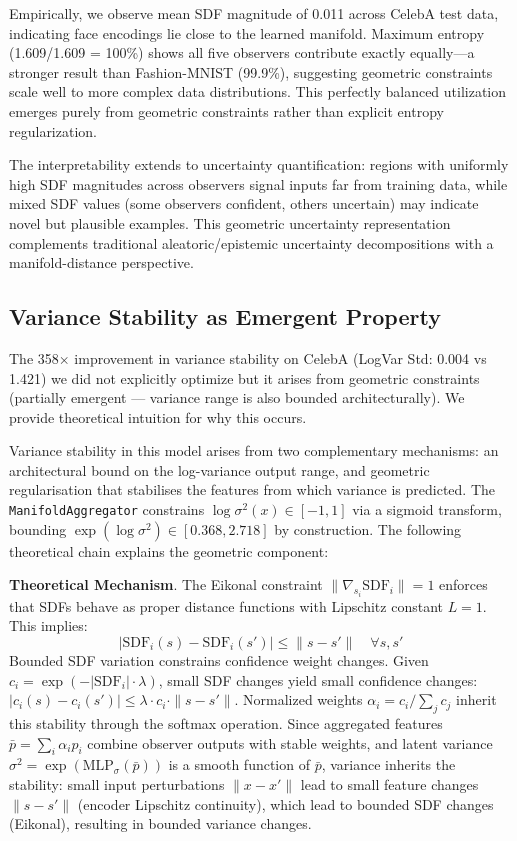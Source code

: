 \documentclass[10pt,twocolumn,letterpaper]{article}
\begin{document}
Empirically, we observe mean SDF magnitude of 0.011 across CelebA test data, indicating face encodings lie close to the learned manifold. Maximum entropy (1.609/1.609 = 100\%) shows all five observers contribute exactly equally---a stronger result than Fashion-MNIST (99.9\%), suggesting geometric constraints scale well to more complex data distributions. This perfectly balanced utilization emerges purely from geometric constraints rather than explicit entropy regularization.

The interpretability extends to uncertainty quantification: regions with uniformly high SDF magnitudes across observers signal inputs far from training data, while mixed SDF values (some observers confident, others uncertain) may indicate novel but plausible examples. This geometric uncertainty representation complements traditional aleatoric/epistemic uncertainty decompositions with a manifold-distance perspective.

\subsection{Variance Stability as Emergent Property}

The 358$\times$ improvement in variance stability on CelebA (LogVar Std: 0.004 vs 1.421) we did not explicitly optimize but it arises from geometric constraints (partially emergent --- variance range is also bounded architecturally). We provide theoretical intuition for why this occurs.

Variance stability in this model arises from two complementary mechanisms: an architectural bound on the log-variance output range, and geometric regularisation that stabilises the features from which variance is predicted. The \texttt{ManifoldAggregator} constrains $\log\sigma^2(x) \in [-1, 1]$ via a sigmoid transform, bounding $\exp(\log\sigma^2) \in [0.368, 2.718]$ by construction. The following theoretical chain explains the geometric component:

\textbf{Theoretical Mechanism}. The Eikonal constraint $\|\nabla_{s_i} \text{SDF}_i\| = 1$ enforces that SDFs behave as proper distance functions with Lipschitz constant $L=1$. This implies:
\begin{equation}
|\text{SDF}_i(s) - \text{SDF}_i(s')| \leq \|s - s'\| \quad \forall s, s'
\end{equation}
Bounded SDF variation constrains confidence weight changes. Given $c_i = \exp(-|\text{SDF}_i| \cdot \lambda)$, small SDF changes yield small confidence changes: $|c_i(s) - c_i(s')| \leq \lambda \cdot c_i \cdot \|s - s'\|$. Normalized weights $\alpha_i = c_i / \sum_j c_j$ inherit this stability through the softmax operation. Since aggregated features $\bar{p} = \sum_i \alpha_i p_i$ combine observer outputs with stable weights, and latent variance $\sigma^2 = \exp(\text{MLP}_\sigma(\bar{p}))$ is a smooth function of $\bar{p}$, variance inherits the stability: small input perturbations $\|x - x'\|$ lead to small feature changes $\|s - s'\|$ (encoder Lipschitz continuity), which lead to bounded SDF changes (Eikonal), resulting in bounded variance changes.
\end{document}
